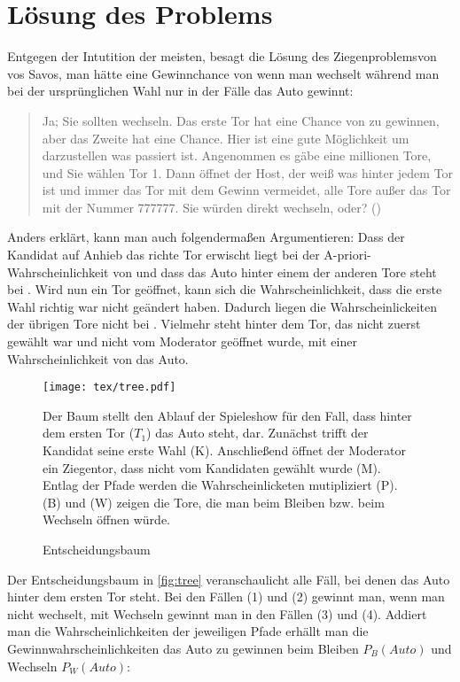 \chapter{Lösung des Problems}

Entgegen der Intutition der meisten, besagt die Lösung des Ziegenproblemsvon vos Savos, man hätte eine Gewinnchance von  wenn man wechselt während man bei der ursprünglichen Wahl nur in  der Fälle das Auto gewinnt:

\begin{quote}
    Ja; Sie sollten wechseln. Das erste Tor hat eine Chance von  zu gewinnen, aber das Zweite hat eine  Chance. Hier ist eine gute Möglichkeit um darzustellen was passiert ist. Angenommen es gäbe eine millionen Tore, und Sie wählen Tor 1. Dann öffnet der Host, der weiß was hinter jedem Tor ist und immer das Tor mit dem Gewinn vermeidet, alle Tore außer das Tor mit der Nummer 777777. Sie würden direkt wechseln, oder? (\cite{Savant:1990})
\end{quote}

Anders erklärt, kann man auch folgendermaßen Argumentieren: Dass der Kandidat auf Anhieb das richte Tor erwischt liegt bei der A-priori-Wahrscheinlichkeit von  und dass das Auto hinter einem der anderen Tore steht bei . Wird nun ein Tor geöffnet, kann sich die Wahrscheinlichkeit, dass die erste Wahl richtig war nicht geändert haben. Dadurch liegen die Wahrscheinlickeiten der übrigen Tore nicht bei . Vielmehr steht hinter dem Tor, das nicht zuerst gewählt war und nicht vom Moderator geöffnet wurde, mit einer Wahrscheinlichkeit von  das Auto.

\begin{figure}[htbp]
    \centering
    \texttt{[image: tex/tree.pdf]}
    \caption{Entscheidungsbaum}\label{fig:tree}
    \small {Der Baum stellt den Ablauf der Spieleshow für den Fall, dass hinter dem ersten Tor ($T_1$) das Auto steht, dar. Zunächst trifft der Kandidat seine erste Wahl (K). Anschließend öffnet der Moderator ein Ziegentor, dass nicht vom Kandidaten gewählt wurde (M). Entlag der Pfade werden die Wahrscheinlicketen mutipliziert (P). (B) und (W) zeigen die Tore, die man beim Bleiben bzw. beim Wechseln öffnen würde.}
\end{figure}

Der Entscheidungsbaum in \autoref{fig:tree} veranschaulicht alle Fäll, bei denen das Auto hinter dem ersten Tor steht. Bei den Fällen (1) und (2) gewinnt man, wenn man nicht wechselt, mit Wechseln gewinnt man in den Fällen (3) und (4). Addiert man die Wahrscheinlichkeiten der jeweiligen Pfade erhällt man die Gewinnwahrscheinlichkeiten das Auto zu gewinnen beim Bleiben $P_B(Auto)$ und Wechseln $P_W(Auto)$:

